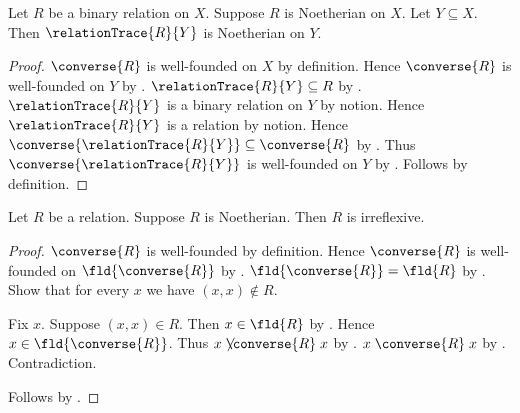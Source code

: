 \begin{proposition}\label{relation_trace_noetherian_on}
    Let $R$ be a binary relation on $X$.
    Suppose $R$ is Noetherian on $X$.
    Let $Y\subseteq X$.
    Then $\relationTrace{R}{Y}$ is Noetherian on $Y$.
\end{proposition}
\begin{proof}
    $\converse{R}$ is well-founded on $X$ by definition.
    Hence $\converse{R}$ is well-founded on $Y$
        by .
    $\relationTrace{R}{Y}\subseteq R$
        by .
    $\relationTrace{R}{Y}$ is a binary relation on $Y$ by notion.
    Hence $\relationTrace{R}{Y}$ is a relation by notion.
    Hence $\converse{\relationTrace{R}{Y}}\subseteq\converse{R}$
        by .
    Thus $\converse{\relationTrace{R}{Y}}$ is well-founded on $Y$
        by .
    Follows by definition.
\end{proof}

\begin{proposition}\label{noetherian_is_irreflexive}
    Let $R$ be a relation.
    Suppose $R$ is Noetherian.
    Then $R$ is irreflexive.
\end{proposition}
\begin{proof}
    $\converse{R}$ is well-founded by definition.
    Hence $\converse{R}$ is well-founded on $\fld{\converse{R}}$
        by .
    $\fld{\converse{R}}=\fld{R}$ by .
    Show that for every $x$ we have $(x,x)\notin R$.
    \begin{subproof}
        Fix $x$.
        Suppose $(x,x)\in R$.
        Then $x\in\fld{R}$ by .
        Hence $x\in\fld{\converse{R}}$.
        Thus $x\not\mathrel{\converse{R}}x$
            by .
        $x\mathrel{\converse{R}}x$ by .
        Contradiction.
    \end{subproof}
    Follows by .
\end{proof}
